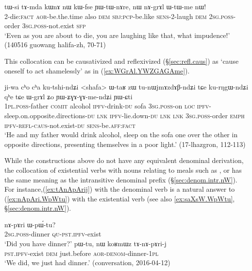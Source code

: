 \begin{exe}
\ex \label{ex:nAGrAl.WtWme}
\gll tɯ-si tɤ-mda kɯnɤ nɯ kɯ-fse ɲɯ-tɯ-nɤre, nɯ nɤ-grɤl ɯ-tɯ-me nɯ! \\
2-die:\textsc{fact} \textsc{aor}-be.the.time also \textsc{dem} \textsc{sbj}:\textsc{pcp}-be.like \textsc{sens}-2-laugh \textsc{dem} \textsc{2sg}.\textsc{poss}-order \textsc{3sg}.\textsc{poss}-not.exist \textsc{sfp} \\
\glt `Even as you are about to die, you are laughing like that, what impudence!' (140516 guowang halifa-zh, 70-71)
\end{exe}

This collocation can be causativized and reflexivized (§\ref{sec:refl.caus}) as  `cause oneself to act shamelessly' as in (\ref{ex:WGrAl.YWZGAGAme}).

\begin{exe}
\ex \label{ex:WGrAl.YWZGAGAme}
\gll ji-wa cʰo cʰa ku-tshi-ndʑi <shafa> ɯ-taʁ zɯ tu-nɯjmɤzdɤβ-ndʑi tɕe ku-rŋgɯ-ndʑi qʰe tɕe
ɯ-grɤl ʑo ɲɯ-ʑɣɤ-ɣɤ-me-ndʑi ɲɯ-ɕti \\
\textsc{1pl}.\textsc{poss}-father \textsc{comit} alcohol \textsc{ipfv}-drink-\textsc{du} sofa \textsc{3sg}.\textsc{poss}-on \textsc{loc} \textsc{ipfv}-sleep.on.opposite.directions-\textsc{du} \textsc{lnk} \textsc{ipfv}-lie.down-\textsc{du} \textsc{lnk} \textsc{lnk} \textsc{3sg}.\textsc{poss}-order \textsc{emph} \textsc{ipfv}-\textsc{refl}-\textsc{caus}-not.exist-\textsc{du} \textsc{sens}-be.\textsc{aff}:\textsc{fact}   \\
\glt `He and my father would drink alcohol, sleep on the sofa one over the other in opposite directions, presenting themselves in a poor light.' (17-lhazgron, 112-113)
\end{exe}


While the constructions above do not have any equivalent denominal derivation, the collocation of existential verbs with nouns relating to meals such as ,  or  has the same meaning as the intransitive  denominal prefix (§\ref{sec:denom.intr.nW}). For instance,(\ref{ex:tAnApArij}) with the denominal verb  is a natural answer to (\ref{ex:nApAri.WpWtu}) with the existential verb (see also \ref{ex:saXsW.WpWtu}, §\ref{sec:denom.intr.nW}).

\begin{exe}
\ex \label{ex:nApAri.WpWtu}
\gll nɤ-pɤri ɯ-pɯ́-tu? \\
\textsc{2sg}.\textsc{poss}-dinner \textsc{qu}-\textsc{pst}.\textsc{ipfv}-exist \\
\glt `Did you have dinner?'
\ex \label{ex:tAnApArij}
\gll pɯ-tu, nɯ koʁmɯz tɤ-nɤ-pɤri-j \\
\textsc{pst}.\textsc{ipfv}-exist \textsc{dem} just.before \textsc{aor}-\textsc{denom}-dinner-\textsc{1pl} \\
\glt `We did, we just had dinner.' (conversation, 2016-04-12)
\end{exe}
  
